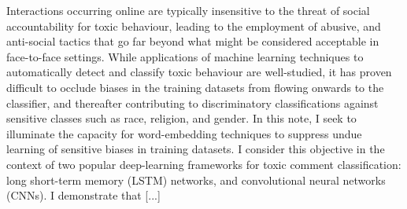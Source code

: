 Interactions occurring online are typically insensitive to the threat of social accountability for toxic behaviour, leading to the employment of abusive, and anti-social tactics that go far beyond what might be considered acceptable in face-to-face settings. While applications of machine learning techniques to automatically detect and classify toxic behaviour are well-studied, it has proven difficult to occlude biases in the training datasets from flowing onwards to the classifier, and thereafter contributing to discriminatory classifications against sensitive classes such as race, religion, and gender. In this note, I seek to illuminate the capacity for word-embedding techniques to suppress undue learning of sensitive biases in training datasets. I consider this objective in the context of two popular deep-learning frameworks for toxic comment classification: long short-term memory (LSTM) networks, and convolutional neural networks (CNNs). I demonstrate that [...]


